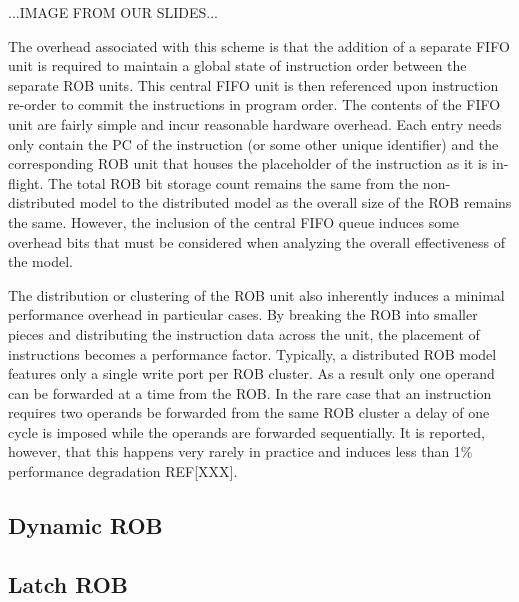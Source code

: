 \documentclass{acm_proc_article-sp}
\begin{document}
...IMAGE FROM OUR SLIDES...

The overhead associated with this scheme is that the addition of a separate FIFO unit
is required to maintain a global state of instruction order between the separate ROB units.
This central FIFO unit is then referenced upon instruction re-order to commit the instructions
in program order.  The contents of the FIFO unit are fairly simple and incur reasonable hardware
overhead.  Each entry needs only contain the PC of the instruction (or some other unique identifier)
and the corresponding ROB unit that houses the placeholder of the instruction as it is in-flight. 
The total ROB bit storage count remains the same from the non-distributed model to the distributed model
as the overall size of the ROB remains the same.  However, the inclusion of the central FIFO queue 
induces some overhead bits that must be considered when analyzing the overall effectiveness of the 
model.  

The distribution or clustering of the ROB unit also inherently induces a minimal performance overhead 
in particular cases.  By breaking the ROB into smaller pieces and distributing the instruction 
data across the unit, the placement of instructions becomes a performance factor.  Typically, a 
distributed ROB model features only a single write port per ROB cluster.  As a result only one operand 
can be forwarded at a time from the ROB.  In the rare case that an instruction requires two operands be 
forwarded from the same ROB cluster a delay of one cycle is imposed while the operands are forwarded 
sequentially.  It is reported, however, that this happens very rarely in practice and induces less than 1\% 
performance degradation REF[XXX].
\subsection{Dynamic ROB}
\subsection{Latch ROB}
\end{document}
